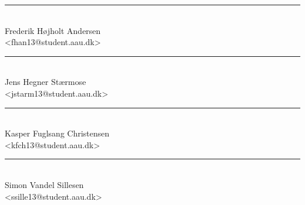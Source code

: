 \noindent
\begin{minipage}[b]{0.45\textwidth}
 \centering
 \rule{\textwidth}{0.5pt}\\
  Frederik Højholt Andersen\\
 {\footnotesize <fhan13@student.aau.dk>}
\end{minipage}
\hfill
\begin{minipage}[b]{0.45\textwidth}
 \centering
 \rule{\textwidth}{0.5pt}\\
  Jens Hegner Stærmose\\
 {\footnotesize <jstarm13@student.aau.dk>}
\end{minipage}
\vspace{3\baselineskip}

\noindent
\begin{minipage}[b]{0.45\textwidth}
 \centering
 \rule{\textwidth}{0.5pt}\\
  Kasper Fuglsang Christensen\\
 {\footnotesize <kfch13@student.aau.dk>}
\end{minipage}
\hfill
\begin{minipage}[b]{0.45\textwidth}
 \centering
 \rule{\textwidth}{0.5pt}\\
  Simon Vandel Sillesen\\
 {\footnotesize <ssille13@student.aau.dk>}
\end{minipage}
\vspace{3\baselineskip}
